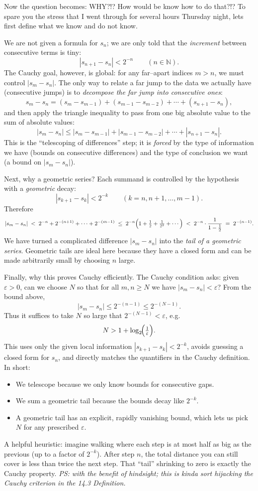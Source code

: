\documentclass[12pt]{article}
\begin{document}
Now the question becomes: WHY?!? How would be know how to do that?!? To spare you the stress that I went through for several hours Thursday night, lets first define what we know and do not know.

We are not given a formula for $s_n$; we are only told that the \emph{increment} between consecutive terms is tiny:
\[
|s_{n+1}-s_n|<2^{-n}\qquad(n\in\mathbb N).
\]
The Cauchy goal, however, is global: for any far–apart indices $m>n$, we must control $|s_m-s_n|$. The only way to relate a far jump to the data we actually have (consecutive jumps) is to \emph{decompose the far jump into consecutive ones}:
\[
s_m-s_n=(s_m-s_{m-1})+(s_{m-1}-s_{m-2})+\cdots+(s_{n+1}-s_n),
\]
and then apply the triangle inequality to pass from one big absolute value to the sum of absolute values:
\[
|s_m-s_n|\le |s_m-s_{m-1}|+|s_{m-1}-s_{m-2}|+\cdots+|s_{n+1}-s_n|.
\]
This is the “telescoping of differences” step; it is \emph{forced} by the type of information we have (bounds on consecutive differences) and the type of conclusion we want (a bound on $|s_m-s_n|$).

Next, why a geometric series? Each summand is controlled by the hypothesis with a \emph{geometric} decay:
\[
|s_{k+1}-s_k|<2^{-k}\qquad(k=n,n+1,\dots,m-1).
\]
Therefore
\[
|s_m-s_n| \;<\; 2^{-n}+2^{-(n+1)}+\cdots+2^{-(m-1)}
\;\le\; 2^{-n}\Bigl(1+\tfrac12+\tfrac1{2^2}+\cdots\Bigr)
\;<\; 2^{-n}\cdot\frac{1}{1-\tfrac12}
\;=\;2^{-(n-1)}.
\]
We have turned a complicated difference $|s_m-s_n|$ into the \emph{tail of a geometric series}. Geometric tails are ideal here because they have a closed form and can be made arbitrarily small by choosing $n$ large.

Finally, why this proves Cauchy efficiently. The Cauchy condition asks: given $\varepsilon>0$, can we choose $N$ so that for all $m,n\ge N$ we have $|s_m-s_n|<\varepsilon$? From the bound above,
\[
|s_m-s_n|\le 2^{-(n-1)}\le 2^{-(N-1)}.
\]
Thus it suffices to take $N$ so large that $2^{-(N-1)}<\varepsilon$, e.g.
\[
N>1+\log_2\!\Bigl(\tfrac1\varepsilon\Bigr).
\]
This uses only the given local information $|s_{k+1}-s_k|<2^{-k}$, avoids guessing a closed form for $s_n$, and directly matches the quantifiers in the Cauchy definition. In short:
\begin{itemize}
  \item We telescope because we only know bounds for consecutive gaps.
  \item We sum a geometric tail because the bounds decay like $2^{-k}$.
  \item A geometric tail has an explicit, rapidly vanishing bound, which lets us pick $N$ for any prescribed $\varepsilon$.
\end{itemize}
A helpful heuristic: imagine walking where each step is at most half as big as the previous (up to a factor of $2^{-k}$). After step $n$, the total distance you can still cover is less than twice the next step. That “tail” shrinking to zero is exactly the Cauchy property. 
\textit{PS: with the benefit of hindsight; this is kinda sort hijacking the Cauchy criterion in the 14.3 Definition.}
\vspace{0.25em}
\end{document}
